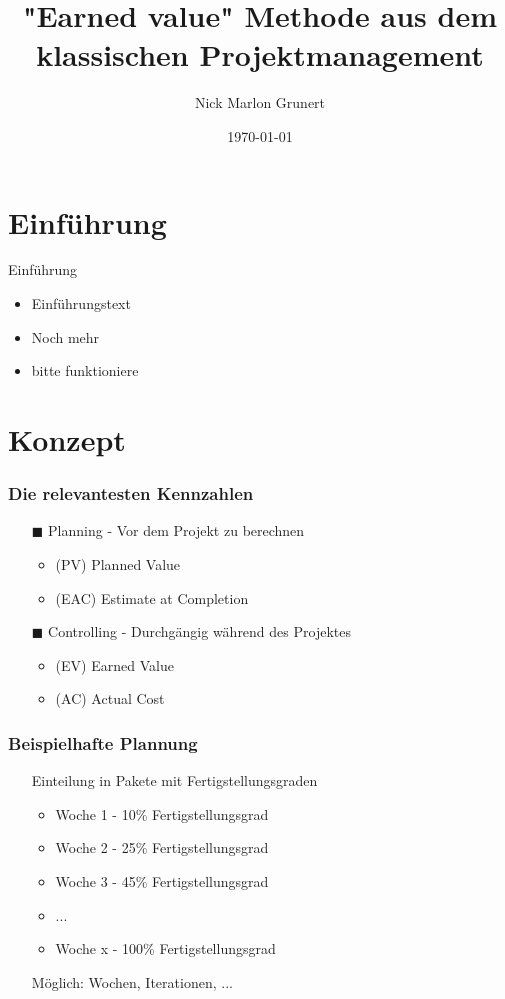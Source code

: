 \documentclass{f4_beamer}
\title{"Earned value" Methode aus dem klassischen Projektmanagement}
\author{Nick Marlon Grunert}
\date{\today}
\begin{document}
\section{Einführung}

\begin{frame}{Einführung}
    \begin{itemize}
        \item Einführungstext
        \item Noch mehr
        \item bitte funktioniere
    \end{itemize}
\end{frame}

%
%


\section{Konzept}
\begin{frame}[fragile]
    \frametitle{Die relevantesten Kennzahlen}
    \Large
    \begin{itemize}
        \item[$\blacksquare$] Planning - Vor dem Projekt zu berechnen
        \begin{itemize}
            \item (PV)  Planned Value
            \item (EAC) Estimate at Completion
        \end{itemize}
        \item[$\blacksquare$] Controlling - Durchgängig während des Projektes
        \begin{itemize}
            \item (EV)  Earned Value
            \item (AC)  Actual Cost
        \end{itemize}
    \end{itemize}
\end{frame}
\begin{frame}[fragile]
    \frametitle{Beispielhafte Plannung}
    \Large
    \begin{itemize}
        \item[] Einteilung in Pakete mit Fertigstellungsgraden
        \begin{itemize}
            \item Woche 1 - 10\% Fertigstellungsgrad
            \item Woche 2 - 25\% Fertigstellungsgrad
            \item Woche 3 - 45\% Fertigstellungsgrad
            \item ...
            \item Woche x - 100\% Fertigstellungsgrad
        \end{itemize}
        \item[]
        \item[] Möglich: Wochen, Iterationen, ...
    \end{itemize}
\end{frame}
\end{document}

